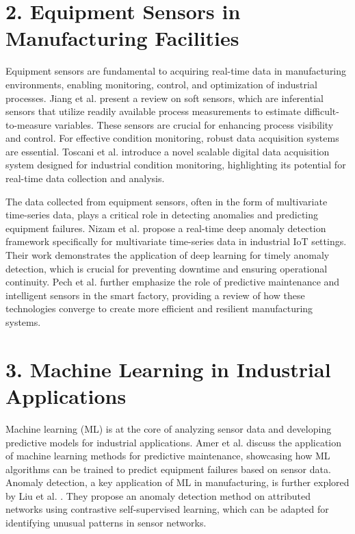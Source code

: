 \section*{2. Equipment Sensors in Manufacturing Facilities}

Equipment sensors are fundamental to acquiring real-time data in manufacturing environments, enabling monitoring, control, and optimization of industrial processes. Jiang et al. \cite{jiang-2020} present a review on soft sensors, which are inferential sensors that utilize readily available process measurements to estimate difficult-to-measure variables. These sensors are crucial for enhancing process visibility and control.  For effective condition monitoring, robust data acquisition systems are essential. Toscani et al. \cite{toscani-2023} introduce a novel scalable digital data acquisition system designed for industrial condition monitoring, highlighting its potential for real-time data collection and analysis.

The data collected from equipment sensors, often in the form of multivariate time-series data, plays a critical role in detecting anomalies and predicting equipment failures. Nizam et al. \cite{nizam-2022} propose a real-time deep anomaly detection framework specifically for multivariate time-series data in industrial IoT settings. Their work demonstrates the application of deep learning for timely anomaly detection, which is crucial for preventing downtime and ensuring operational continuity. Pech et al. \cite{pech-2021} further emphasize the role of predictive maintenance and intelligent sensors in the smart factory, providing a review of how these technologies converge to create more efficient and resilient manufacturing systems.

\section*{3. Machine Learning in Industrial Applications}

Machine learning (ML) is at the core of analyzing sensor data and developing predictive models for industrial applications. Amer et al. \cite{amer-2023} discuss the application of machine learning methods for predictive maintenance, showcasing how ML algorithms can be trained to predict equipment failures based on sensor data.  Anomaly detection, a key application of ML in manufacturing, is further explored by Liu et al. \cite{liu-2021}. They propose an anomaly detection method on attributed networks using contrastive self-supervised learning, which can be adapted for identifying unusual patterns in sensor networks.

